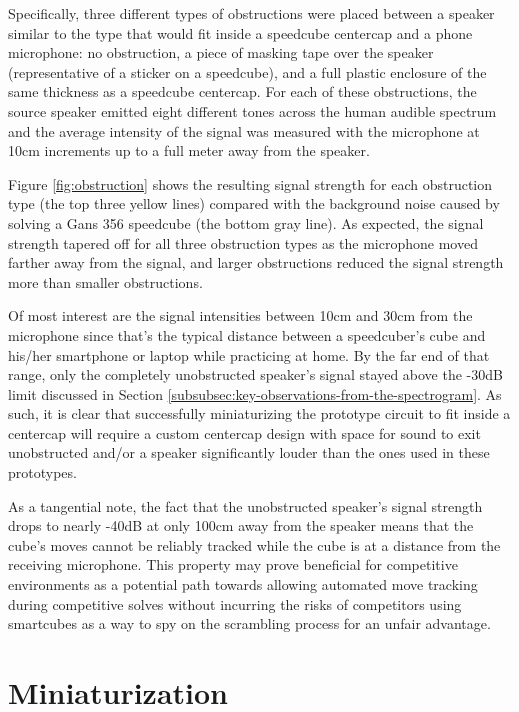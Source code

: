 Specifically, three different types of obstructions were placed between
a speaker similar to the type that would fit inside a speedcube
centercap and a phone microphone: no obstruction, a piece of masking
tape over the speaker (representative of a sticker on a speedcube), and
a full plastic enclosure of the same thickness as a speedcube
centercap. For each of these obstructions, the source speaker emitted
eight different tones across the human audible spectrum and the average
intensity of the signal was measured with the microphone at 10cm
increments up to a full meter away from the speaker.

Figure \ref{fig:obstruction} shows the resulting signal strength for
each obstruction type (the top three yellow lines) compared with the
background noise caused by solving a Gans 356 speedcube (the bottom
gray line). As expected, the signal strength tapered off for all three
obstruction types as the microphone moved farther away from the signal,
and larger obstructions reduced the signal strength more than smaller
obstructions.

Of most interest are the signal intensities between 10cm and 30cm from
the microphone since that's the typical distance between a speedcuber's
cube and his/her smartphone or laptop while practicing at home. By the
far end of that range, only the completely unobstructed speaker's
signal stayed above the -30dB limit discussed in Section
\ref{subsubsec:key-observations-from-the-spectrogram}. As such, it is
clear that successfully miniaturizing the prototype circuit to fit
inside a centercap will require a custom centercap design with space
for sound to exit unobstructed and/or a speaker significantly louder
than the ones used in these prototypes.

As a tangential note, the fact that the unobstructed speaker's signal
strength drops to nearly -40dB at only 100cm away from the speaker
means that the cube's moves cannot be reliably tracked while the cube
is at a distance from the receiving microphone. This property may prove
beneficial for competitive environments as a potential path towards
allowing automated move tracking during competitive solves without
incurring the risks of competitors using smartcubes as a way to spy on
the scrambling process for an unfair advantage.


\section{Miniaturization}
\label{sec:miniaturization}

